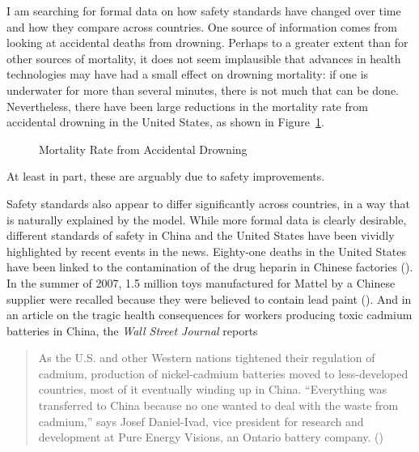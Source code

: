 \documentclass[12pt,twoside]{article}
\newcommand{\cnp}[1]{(\citealt{#1})}  %
\begin{document}
I am searching for formal data on how safety standards have changed over
time and how they compare across countries. One source of information
comes from looking at accidental deaths from drowning. Perhaps to a
greater extent than for other sources of mortality, it does not seem
implausible that advances in health technologies may have had a small
effect on drowning mortality: if one is underwater for more than several
minutes, there is not much that can be done. Nevertheless, there have
been large reductions in the mortality rate from accidental drowning in
the United States, as shown in Figure~\ref{fig:drown}.
\begin{figure}[tp]
\caption{Mortality Rate from Accidental Drowning}
\label{fig:drown}
\end{figure} 
At least in part, these are arguably due to safety improvements.


Safety standards also appear to differ significantly across countries,
in a way that is naturally explained by the model. While more formal
data is clearly desirable, different standards of safety in China and
the United States have been vividly highlighted by recent events in the
news. Eighty-one deaths in the United States have been linked to the
contamination of the drug heparin in Chinese factories
\cnp{MundyWSJ2008}. In the summer of 2007, 1.5 million toys manufactured
for Mattel by a Chinese supplier were recalled because they were
believed to contain lead paint \cnp{SpencerYeWSJ2008}. And in an article
on the tragic health consequences for workers producing toxic cadmium
batteries in China, the {\it Wall Street Journal} reports
\begin{quote}
As the U.S. and other Western nations tightened their regulation of
cadmium, production of nickel-cadmium batteries moved to less-developed
countries, most of it eventually winding up in China. ``Everything was
transferred to China because no one wanted to deal with the waste from
cadmium,'' says Josef Daniel-Ivad, vice president for research and
development at Pure Energy Visions, an Ontario battery company. 
\cnp{CaseyZamiskaWSJ2007}
\end{quote}
\end{document}
